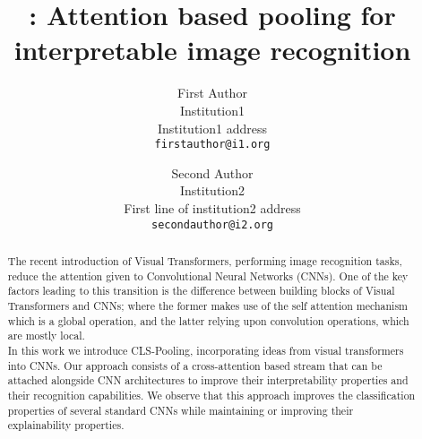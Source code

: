 \documentclass[10pt,twocolumn,letterpaper]{article}
\begin{document}



\title{\Ours: Attention based pooling for interpretable image recognition}

\author{First Author\\
Institution1\\
Institution1 address\\
{\tt\small firstauthor@i1.org}
\and
Second Author\\
Institution2\\
First line of institution2 address\\
{\tt\small secondauthor@i2.org}
}

\maketitle
\ifwacvfinal\thispagestyle{empty}\fi


\begin{abstract}
The recent introduction of Visual Transformers, performing image recognition tasks, reduce the attention given to Convolutional Neural Networks (CNNs). One of the key factors leading to this transition is the difference between building blocks of Visual Transformers and CNNs; where the former makes use of the self attention mechanism which is a global operation, and the latter relying upon convolution operations, which are mostly local.\\
In this work we introduce CLS-Pooling, incorporating ideas from visual transformers into CNNs. Our approach consists of a cross-attention based stream that can be attached alongside CNN architectures to improve their interpretability properties and their recognition capabilities. We observe that this approach improves the classification properties of several standard CNNs while maintaining or improving their explainability properties.
\end{abstract}










\end{document}

